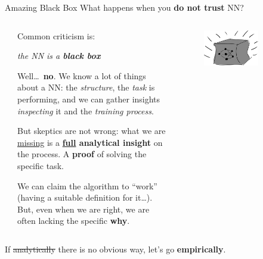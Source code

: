 \documentclass[9pt]{beamer}
\begin{document}
\begin{frame}{Amazing Black Box}
    What happens when you \textbf{do not trust} NN?
    \vspace*{20pt}

    \begin{columns}
        \begin{column}{0.05\textwidth}
        \end{column}
        \begin{column}{0.5\textwidth}
            Common criticism is:
            \begin{center}
                \itshape
                the NN is a \textbf{black box}
            \end{center}
            \vspace*{5pt}

            Well\dots\ \textbf{no}.\newline
            We know a lot of things about a NN: the \textit{structure}, the
            \textit{task} is performing, and we can gather insights
            \textit{inspecting} it and the \textit{training process}.
            \vspace*{10pt}

            But skeptics are not wrong: what we are \uline{missing} is a
            \textbf{\uline{full} analytical insight} on the process. A
            \textbf{proof} of solving the specific task.
            \vspace*{10pt}

            We can claim the algorithm to \enquote{work} (having a suitable
            definition for it\dots). But, even when we are right, we are often
            lacking the specific \textbf{why}.
        \end{column}
        \begin{column}{0.5\textwidth}
            \begin{figure}
                \centering
                \includegraphics[width=0.7\textwidth]{black-box}
            \end{figure}
        \end{column}
    \end{columns}
    \vspace*{20pt}

    \begin{center}
        If \sout{analytically} there is no obvious way, let's go \textbf{empirically}.
    \end{center}
\end{frame}
\end{document}
